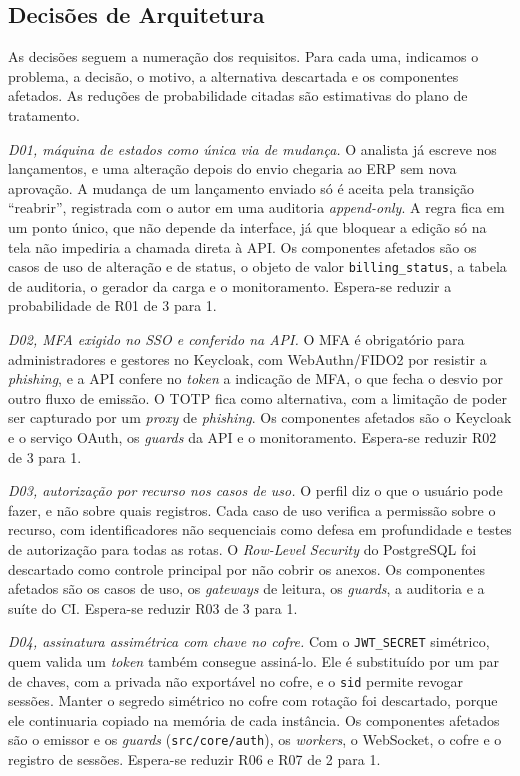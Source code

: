 \documentclass[conference]{IEEEtran}
\begin{document}
\subsection{Decisões de Arquitetura}
\label{subsec:decisoes}

As decisões seguem a numeração dos requisitos. Para cada uma, indicamos o problema, a decisão, o motivo, a alternativa descartada e os componentes afetados. As reduções de probabilidade citadas são estimativas do plano de tratamento.

\emph{D01, máquina de estados como única via de mudança.} O analista já escreve nos lançamentos, e uma alteração depois do envio chegaria ao ERP sem nova aprovação. A mudança de um lançamento enviado só é aceita pela transição ``reabrir'', registrada com o autor em uma auditoria \textit{append-only}. A regra fica em um ponto único, que não depende da interface, já que bloquear a edição só na tela não impediria a chamada direta à API. Os componentes afetados são os casos de uso de alteração e de status, o objeto de valor \texttt{billing\_status}, a tabela de auditoria, o gerador da carga e o monitoramento. Espera-se reduzir a probabilidade de R01 de 3 para 1.

\emph{D02, MFA exigido no SSO e conferido na API.} O MFA é obrigatório para administradores e gestores no Keycloak, com WebAuthn/FIDO2 por resistir a \textit{phishing}, e a API confere no \textit{token} a indicação de MFA, o que fecha o desvio por outro fluxo de emissão. O TOTP fica como alternativa, com a limitação de poder ser capturado por um \textit{proxy} de \textit{phishing}. Os componentes afetados são o Keycloak e o serviço OAuth, os \textit{guards} da API e o monitoramento. Espera-se reduzir R02 de 3 para 1.

\emph{D03, autorização por recurso nos casos de uso.} O perfil diz o que o usuário pode fazer, e não sobre quais registros. Cada caso de uso verifica a permissão sobre o recurso, com identificadores não sequenciais como defesa em profundidade e testes de autorização para todas as rotas. O \textit{Row-Level Security} do PostgreSQL foi descartado como controle principal por não cobrir os anexos. Os componentes afetados são os casos de uso, os \textit{gateways} de leitura, os \textit{guards}, a auditoria e a suíte do CI. Espera-se reduzir R03 de 3 para 1.

\emph{D04, assinatura assimétrica com chave no cofre.} Com o \texttt{JWT\_SECRET} simétrico, quem valida um \textit{token} também consegue assiná-lo. Ele é substituído por um par de chaves, com a privada não exportável no cofre, e o \texttt{sid} permite revogar sessões. Manter o segredo simétrico no cofre com rotação foi descartado, porque ele continuaria copiado na memória de cada instância. Os componentes afetados são o emissor e os \textit{guards} (\texttt{src/core/auth}), os \textit{workers}, o WebSocket, o cofre e o registro de sessões. Espera-se reduzir R06 e R07 de 2 para 1.
\end{document}

